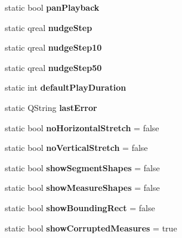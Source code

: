 \begin{DoxyCompactItemize}
static bool {\bfseries pan\+Playback}
\item 
\mbox{\label{class_ms_1_1_m_score_a8df15d21836a82f3655265f5a8b5e2ad}} 
static qreal {\bfseries nudge\+Step}
\item 
\mbox{\label{class_ms_1_1_m_score_a69bdf5fa192ef7ce156a07497e67cda1}} 
static qreal {\bfseries nudge\+Step10}
\item 
\mbox{\label{class_ms_1_1_m_score_a0f5b69e1b9877413351975f4bef2b02e}} 
static qreal {\bfseries nudge\+Step50}
\item 
\mbox{\label{class_ms_1_1_m_score_a58ca4d37edf287ef1b41650a3b6fa83d}} 
static int {\bfseries default\+Play\+Duration}
\item 
\mbox{\label{class_ms_1_1_m_score_a683dccfc76e02ef932843d86f09a260f}} 
static Q\+String {\bfseries last\+Error}
\item 
\mbox{\label{class_ms_1_1_m_score_a0df5f1a470654ab4cd89e148f2d6f14f}} 
static bool {\bfseries no\+Horizontal\+Stretch} = false
\item 
\mbox{\label{class_ms_1_1_m_score_a4a728f9ca94208b1b67962318eea1317}} 
static bool {\bfseries no\+Vertical\+Stretch} = false
\item 
\mbox{\label{class_ms_1_1_m_score_a0a2c87368a022590120e2e25848d4320}} 
static bool {\bfseries show\+Segment\+Shapes} = false
\item 
\mbox{\label{class_ms_1_1_m_score_abc0c22a5e0b4f8567a5888ca6a54d9f5}} 
static bool {\bfseries show\+Measure\+Shapes} = false
\item 
\mbox{\label{class_ms_1_1_m_score_a0b36375e5c943b4dca91624f0cdd4c63}} 
static bool {\bfseries show\+Bounding\+Rect} = false
\item 
\mbox{\label{class_ms_1_1_m_score_a6dad4596647775c77a597679fb98cb45}} 
static bool {\bfseries show\+Corrupted\+Measures} = true

\end{DoxyCompactItemize}
